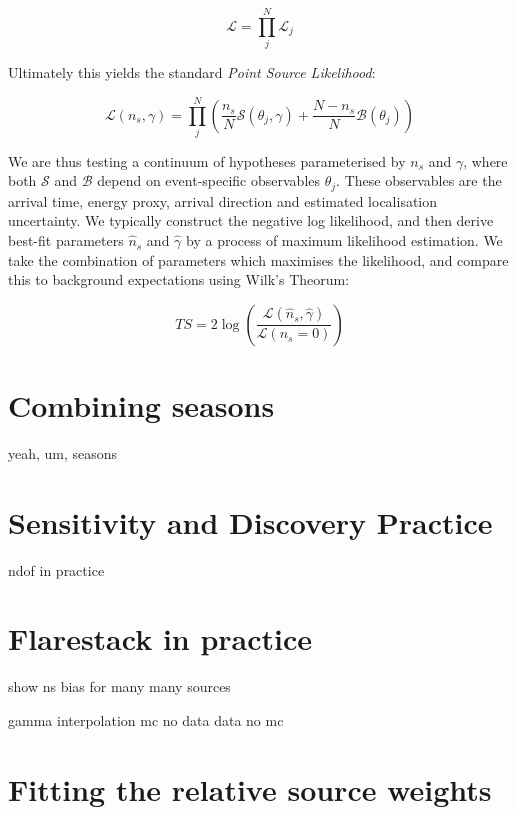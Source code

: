 \[ \mathcal{L} = \prod_{j}^{N} \mathcal{L}_{j} \]

Ultimately this yields the standard \emph{Point Source Likelihood}:

\[ \mathcal{L}(n_{s}, \gamma) = \prod_{j}^{N} \left(\frac{n_{s}}{N} \mathcal{S}(\theta_{j}, \gamma) + \frac{N - n_{s}}{N} \mathcal{B}(\theta_{j})  \right)\]

We are thus testing a continuum of hypotheses parameterised by $n_{s}$ and $\gamma$, where both $\mathcal{S}$ and $\mathcal{B}$ depend on event-specific observables $\theta_{j}$. These observables are the arrival time, energy proxy, arrival direction and estimated localisation uncertainty. We typically construct the negative log likelihood, and then derive best-fit parameters $\hat{n}_{s}$ and  $\hat{\gamma}$ by a process of maximum likelihood estimation. We take the combination of parameters which maximises the likelihood, and compare this to background expectations using Wilk's Theorum:

\[ TS = 2 \log \left( \frac{ \mathcal{L}(\hat{n}_{s}, \hat{\gamma}) }{\mathcal{L}(n_{s} = 0)} \right)\]

\section{Combining seasons}

yeah, um, seasons

\section{Sensitivity and Discovery Practice}

ndof in practice

\section{Flarestack in practice}

show ns  bias for many many sources

gamma interpolation
mc no data
data no mc

\section{Fitting the relative source weights}

